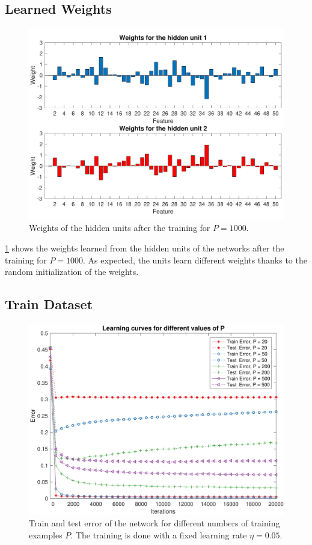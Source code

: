 \subsection{Learned Weights}
\begin{figure}[t]
	\centering
	\includegraphics[width=\columnwidth]{figures/weights_p_1000}
    \caption{Weights of the hidden units after the training for $P = 1000$.}
	\label{fig:weights}
\end{figure}

\cref{fig:weights} shows the weights learned from the hidden units of the networks after the training for $P = 1000$.
As expected, the units learn different weights thanks to the random initialization of the weights.

\subsection{Train Dataset}
\begin{figure}[t]
	\centering
	\includegraphics[width=\columnwidth]{figures/error_ps}
	\caption{Train and test error of the network for different numbers of training examples $P$. The training is done with a fixed learning rate $\eta = 0.05$.}
	\label{fig:ps}
\end{figure}

